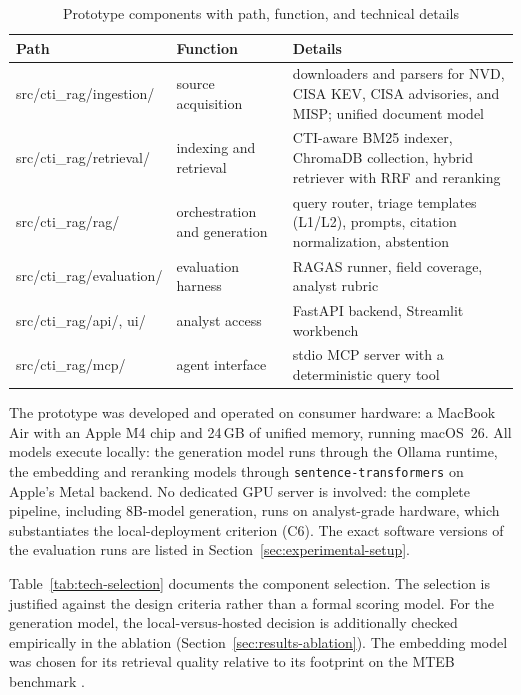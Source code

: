 \begin{table}[H]
    \centering
    \small
    \begin{tabular}{lp{}p{}}
        \toprule
        \textbf{Path} & \textbf{Function} & \textbf{Details} \\
        \midrule
        src/cti\_rag/ingestion/ & source acquisition & downloaders and
            parsers for NVD, CISA KEV, CISA advisories, and MISP; unified
            document model \\
        src/cti\_rag/retrieval/ & indexing and retrieval & CTI-aware BM25
            indexer, ChromaDB collection, hybrid retriever with RRF and
            reranking \\
        src/cti\_rag/rag/ & orchestration and generation & query router,
            triage templates (L1/L2), prompts, citation normalization,
            abstention \\
        src/cti\_rag/evaluation/ & evaluation harness & RAGAS runner,
            field coverage, analyst rubric \\
        src/cti\_rag/api/, ui/ & analyst access & FastAPI backend,
            Streamlit workbench \\
        src/cti\_rag/mcp/ & agent interface & stdio MCP server with a
            deterministic query tool \\
        \bottomrule
    \end{tabular}
    \caption{Prototype components with path, function, and technical details}
    \label{tab:components}
\end{table}

The prototype was developed and operated on consumer hardware: a MacBook
Air with an Apple M4 chip and 24\,GB of unified memory, running
macOS~26. All models execute locally: the generation model runs through the
Ollama runtime, the embedding and reranking models through
\texttt{sentence-transformers} on Apple's Metal backend. No dedicated GPU
server is involved: the complete pipeline, including 8B-model generation,
runs on analyst-grade hardware, which substantiates the local-deployment
criterion (C6). The exact software versions of the evaluation runs are
listed in Section~\ref{sec:experimental-setup}.

Table~\ref{tab:tech-selection} documents the component selection. The
selection is justified against the design criteria rather than a formal
scoring model. For the generation model, the local-versus-hosted decision
is additionally checked empirically in the ablation
(Section~\ref{sec:results-ablation}). The embedding model was chosen for
its retrieval quality relative to its footprint on the MTEB benchmark
\parencite{muennighoff2023mteb}.

